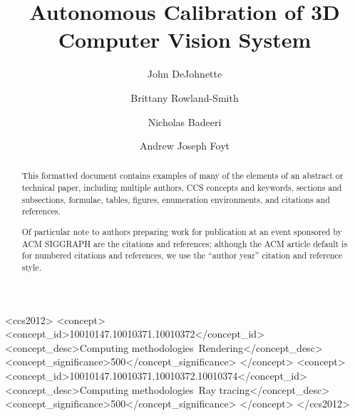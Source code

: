 \documentclass[acmtog]{acmart}
\begin{document}
\title{Autonomous Calibration of 3D Computer Vision System}

\author{John DeJohnette}

\author{Brittany Rowland-Smith}

\author{Nicholas Badeeri}

\author{Andrew Joseph Foyt}

\renewcommand{\shortauthors}{DeJohnette, Rowland-Smith, Badeeri, and Foyt}

\begin{abstract}
This formatted document contains examples of many of the elements of an abstract or technical paper, including multiple authors, CCS concepts and keywords, sections and subsections, formulae, tables, figures, enumeration environments, and citations and references. 

Of particular note to authors preparing work for publication at an event sponsored by ACM SIGGRAPH are the citations and references; although the ACM article default is for numbered citations and references, we use the ``author year'' citation and reference style.
\end{abstract}

\begin{CCSXML}
<ccs2012>
<concept>
<concept_id>10010147.10010371.10010372</concept_id>
<concept_desc>Computing methodologies~Rendering</concept_desc>
<concept_significance>500</concept_significance>
</concept>
<concept>
<concept_id>10010147.10010371.10010372.10010374</concept_id>
<concept_desc>Computing methodologies~Ray tracing</concept_desc>
<concept_significance>500</concept_significance>
</concept>
</ccs2012>
\end{CCSXML}


\end{document}

